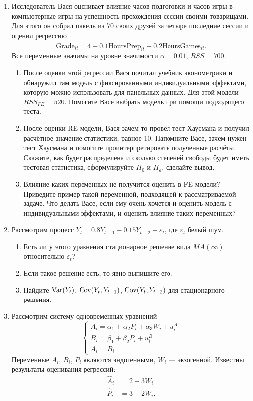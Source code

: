\begin{enumerate}
  \item Исследователь Вася оценивает влияние часов подготовки и часов игры в компьютерные игры на успешность прохождения сессии своими товарищами. 
  Для этого он собрал панель из 70 своих
  друзей за четыре последние сессии и оценил регрессию 
  \[
  \widehat{\text{Grade}} _ {it} =4 - 0.1 \text{HoursPrep}_{it} + 0.2 \text{HoursGames}_{it}.
  \]
  Все переменные значимы на уровне значимости $\alpha=0.01$, $RSS=700$.

  \begin{enumerate}
    \item После оценки этой регрессии Вася почитал учебник эконометрики и обнаружил там модель с фиксированными индивидуальными эффектами, 
    которую можно использовать для панельных данных. 
    Для этой модели $RSS_{FE}=520$. 
    Помогите Васе выбрать модель при помощи подходящего теста.
    \item После оценки RE-модели, Вася зачем-то провёл тест Хаусмана и получил расчётное значение статистики, равное 10. 
    Напомните Васе, зачем нужен тест Хаусмана и помогите проинтерпретировать полученные расчёты.
    Скажите, как будет распределена и сколько степеней свободы будет иметь тестовая статистика, сформулируйте $H_0$ и $H_a$, сделайте вывод.
    \item Влияние каких переменных не получится оценить в FE модели? 
    Приведите пример такой переменной, подходящей к рассматриваемой задаче. 
    Что делать Васе, если ему очень хочется и оценить модель с индивидуальными эффектами, и оценить влияние таких переменных?
  \end{enumerate}
  
  \item Рассмотрим процесс $Y_{t}=0.8 Y_{t-1}-0.15 Y_{t-2}+\varepsilon_t$, где $\varepsilon_t$ белый шум.
  \begin{enumerate}
    \item Есть ли у этого уравнения стационарное решение вида $MA(\infty)$ относительно $\varepsilon_t$?
    \item Если такое решение есть, то явно выпишите его.
    \item Найдите $\operatorname{Var}(Y_t)$, $\operatorname{Cov}(Y_t, Y_{t-1})$, $\operatorname{Cov}(Y_t, Y_{t-2})$ для стационарного решения.
  \end{enumerate}

  \item Рассмотрим систему одновременных уравнений
  \[
  \begin{cases}
  A_{i}=\alpha_{1}+\alpha_{2} P_{i}+\alpha_{3} W_{i}+u_{i}^{A} \\
  B_{i}=\beta_{1}+\beta_{2} P_{i}+u_{i}^{B} \\
  A_{i}=B_{i}
  \end{cases}
  \]
  Переменные $A_{i}$, $B_{i}$, $P_{i}$ являются эндогенными, $W_{i}$ — экзогенной. 
  Известны результаты оценивания регрессий:
  \[
  \begin{aligned}
  \hat{A}_{i} &=2+3 W_{i} \\
  \hat{P}_{i} &=3-2 W_{i}.
  \end{aligned}
  \]


\end{enumerate}
